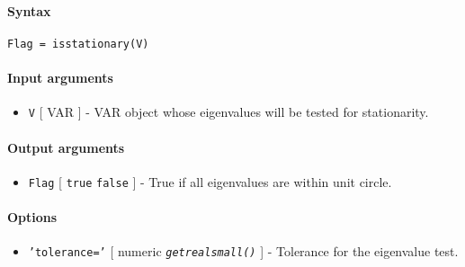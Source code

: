 


	\paragraph{Syntax}\label{syntax}

\begin{verbatim}
Flag = isstationary(V)
\end{verbatim}

\paragraph{Input arguments}\label{input-arguments}

\begin{itemize}
\itemsep1pt\parskip0pt
\item
  \texttt{V} {[} VAR {]} - VAR object whose eigenvalues will be tested
  for stationarity.
\end{itemize}

\paragraph{Output arguments}\label{output-arguments}

\begin{itemize}
\itemsep1pt\parskip0pt
\item
  \texttt{Flag} {[} \texttt{true} \textbar{} \texttt{false} {]} - True
  if all eigenvalues are within unit circle.
\end{itemize}

\paragraph{Options}\label{options}

\begin{itemize}
\itemsep1pt\parskip0pt
\item
  \texttt{'tolerance='} {[} numeric \textbar{}
  \emph{\texttt{getrealsmall()}} {]} - Tolerance for the eigenvalue
  test.
\end{itemize}


